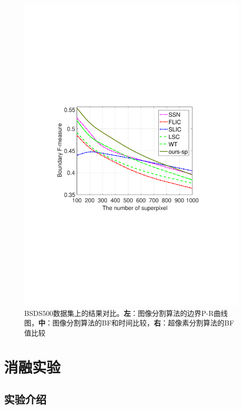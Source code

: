 \begin{figure}[h]
{\begin{minipage}[b]{0.3\linewidth}
\includegraphics[width=1\linewidth]{figures/img/Chart/fig1_3.pdf}
\end{minipage}}
\caption{BSDS500数据集上的结果对比。\textbf{左}：图像分割算法的边界P-R曲线图，\textbf{中}：图像分割算法的BF和时间比较，\textbf{右}：超像素分割算法的BF值比较}
\label{Fig.3}
\end{figure}

\section{消融实验}

\subsection{实验介绍}

